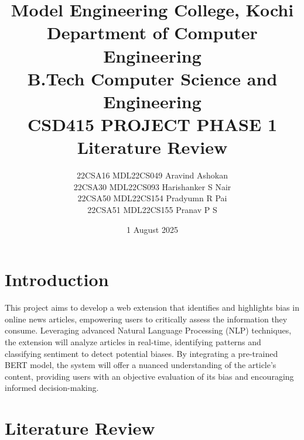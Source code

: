 \documentclass{article}
\begin{document}
\sloppy

\title{Model Engineering College, Kochi\\
    Department of Computer Engineering\\
    B.Tech Computer Science and Engineering\\
    CSD415 PROJECT PHASE 1\\
    \textbf{Literature Review}\\
}

\author{
    22CSA16 MDL22CS049 Aravind Ashokan\\
    22CSA30 MDL22CS093 Harishanker S Nair\\
    22CSA50 MDL22CS154 Pradyumn R Pai\\
    22CSA51 MDL22CS155 Pranav P S\\
}
\date{1 August 2025}
\maketitle

\section{Introduction}
This project aims to develop a web extension that identifies and highlights bias in online news articles, empowering users to critically assess the information they consume. Leveraging advanced Natural Language Processing (NLP) techniques, the extension will analyze articles in real-time, identifying patterns and classifying sentiment to detect potential biases. By integrating a pre-trained BERT model, the system will offer a nuanced understanding of the article's content, providing users with an objective evaluation of its bias and encouraging informed decision-making.

\section{Literature Review}







\end{document}
